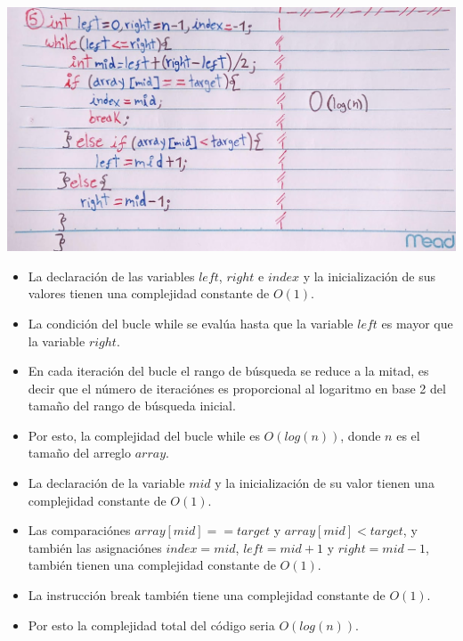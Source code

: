 \documentclass[a4paper,onecolumn,10pt]{article}
\begin{document}
\includegraphics[width=1.15\linewidth]{imagenes/punto 5.jpeg}
\\
\begin{itemize}

    \item La declaración de las variables $left$, $right$ e $index$ y la inicialización de sus valores tienen una complejidad constante de $O(1)$.
    
    \item La condición del bucle while se evalúa hasta que la variable $left$ es mayor que la variable $right$.
    
    \item En cada iteración del bucle el rango de búsqueda se reduce a la mitad, es decir que el número de iteraciónes es proporcional al logaritmo en base 2 del tamaño del rango de búsqueda inicial.
    
    \item Por esto, la complejidad del bucle while es $O(log(n))$, donde $n$ es el tamaño del arreglo $array$.
    
    \item La declaración de la variable $mid$ y la inicialización de su valor tienen una complejidad constante de $O(1)$.
    
    \item Las comparaciónes $array[mid] == target$ y $array[mid] < target$, y también las asignaciónes $index = mid$, $left = mid + 1$ y $right = mid - 1$, también tienen una complejidad constante de $O(1)$.
    
    \item La instrucción break también tiene una complejidad constante de $O(1)$.
    
    \item Por esto la complejidad total del código seria $O(log(n))$.

\end{itemize}
\end{document}
